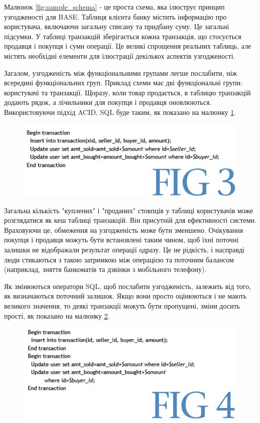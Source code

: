 \documentclass[14pt]{vakthesis}
\begin{document}
Малюнок \ref{fig:sample_schema} - це проста схема, яка ілюструє принцип узгодженості для BASE. Таблиця клієнта банку 
містить інформацію про користувача, включаючи загальну списану та придбану суму. 
Це загальні підсумки. У таблиці транзакцій зберігається кожна транзакція, що стосується продавця і покупця і суми операції. 
Це великі спрощення реальних таблиць, але містять необхідні елементи для ілюстрації декількох аспектів узгодженості.

Загалом, узгодженість між функціональними групами легше послабити, ніж всередині функціональних груп. Приклад схеми має дві функціональні групи: користувачі та транзакції. Щоразу, коли товар продається, в таблицю транзакцій додають рядок, а лічильники для покупця і продавця оновлюються. Використовуючи підхід ACID, SQL буде таким, як показано на малюнку \ref{fig:sql_query}.

\begin{figure}
\centering
\includegraphics[width=\linewidth]{images/sql_query.jpg}
     \label{fig:sql_query}
\end{figure}

Загальна кількість "куплених" і "проданих" стовпців у таблиці користувачів може розглядатися як кеш таблиці транзакцій. 
Він присутній для ефективності системи. Враховуючи це, обмеження на узгодженість може бути зменшено. Очікування покупця і продавця можуть бути встановлені таким чином, щоб їхні поточні залишки не відображали результат операції одразу. 
Це не рідкість, і насправді люди стикаються з такою затримкою між операцією та поточним балансом (наприклад, зняття банкоматів та дзвінки з мобільного телефону).

Як змінюються оператори SQL, щоб послабити узгодженість, залежить від того, як визначаються поточний залишок. Якщо вони просто оцінюються і не мають великого значення, то деякі транзакції можуть бути пропущені, зміни досить прості, як показано на малюнку \ref{fig:transaction}.

\begin{figure}
\centering
\includegraphics[width=\linewidth]{images/transaction.jpg}
     \label{fig:transaction}
\end{figure}
\end{document}
